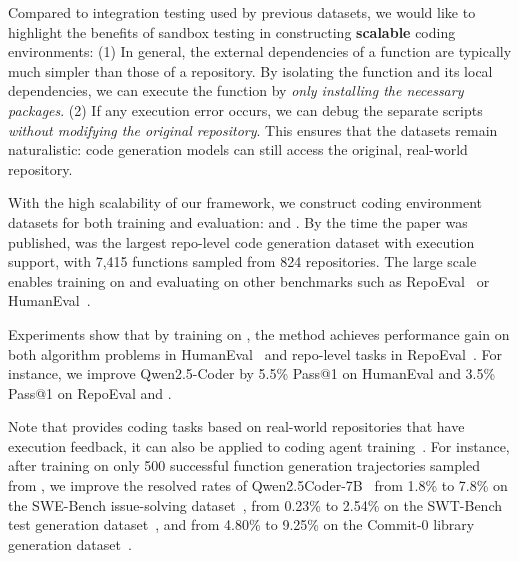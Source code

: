 Compared to integration testing used by previous datasets, we would like to highlight the benefits of sandbox testing in constructing \textbf{scalable} coding environments:
(1) In general, the external dependencies of a function are typically much simpler than those of a repository.
By isolating the function and its local dependencies, we can execute the function by \textit{only installing the necessary packages}.
(2) If any execution error occurs, we can debug the separate scripts \textit{without modifying the original repository}. This ensures that the datasets remain naturalistic: 
code generation models can still access the original, real-world repository.

With the high scalability of our framework, we construct coding environment datasets for both training and evaluation: \reposttrainsetName and \repostevalsetName.
By the time the paper was published, \reposttrainsetName was the largest repo-level code generation dataset with execution support, with 7,415 functions sampled from 824 repositories.
The large scale enables training on \reposttrainsetName and evaluating on other benchmarks such as RepoEval~\citep{repocoder} or HumanEval~\citep{codex}.

Experiments show that by training on \reposttrainsetName, the method achieves performance gain on both algorithm problems in HumanEval~\citep{codex} and repo-level tasks in RepoEval~\citep{repocoder}.
For instance, we improve Qwen2.5-Coder by 5.5\% Pass@1 on HumanEval and 3.5\% Pass@1 on RepoEval and \repostevalsetName.

Note that \reposttrainsetName provides coding tasks based on real-world repositories that have execution feedback, it can also be applied to coding agent training~\citep{sweagent,openhands}.
For instance, after training on only 500 successful function generation trajectories sampled from \reposttrainsetName, we improve the resolved rates of Qwen2.5Coder-7B~\cite{qwen25coder} from 1.8\% to 7.8\% on the SWE-Bench issue-solving dataset~\cite{swebench}, from 0.23\% to 2.54\% on the SWT-Bench test generation dataset~\cite{swt-bench}, and from 4.80\% to 9.25\% on the Commit-0 library generation dataset~\cite{commit0}.


